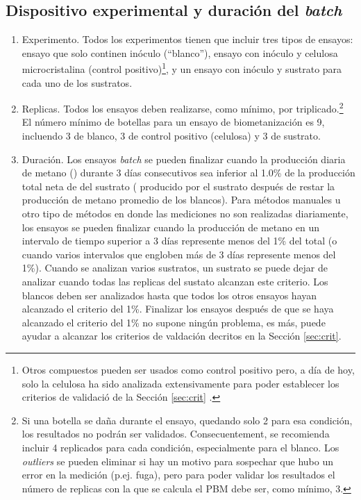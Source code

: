 \documentclass[]{article}
\begin{document}
\subsection{Dispositivo experimental y duración del \emph{batch}}
\label{sec:setup}
\begin{enumerate}
  \item Experimento. 
    Todos los experimentos tienen que incluir tres tipos de ensayos: ensayo que solo continen inóculo (``blanco''), ensayo con inóculo y celulosa microcristalina (control positivo)\footnote{
      Otros compuestos pueden ser usados como control positivo pero, a día de hoy, solo la celulosa ha sido analizada extensivamente para poder establecer los criterios de validació de la Sección \ref{sec:crit} \citep{hafnerImprovingInterlaboratoryReproducibility2020}.
    }, y un ensayo con inóculo y sustrato para cada uno de los sustratos.
    \item Replicas. 
    Todos los ensayos deben realizarse, como mínimo, por triplicado.\footnote{
      Si una botella se daña durante el ensayo, quedando solo 2 para esa condición, los resultados no podrán ser validados. Consecuentement, se recomienda incluir 4 replicados para cada condición, especialmente para el blanco. Los \emph{outliers} se pueden eliminar si hay un motivo para sospechar que hubo un error en la medición (p.ej. fuga), pero para poder validar los resultados el número de replicas con la que se calcula el PBM debe ser, como mínimo, 3.
    }
    El número mínimo de botellas para un ensayo de biometanización es 9, incluendo 3 de blanco, 3 de control positivo (celulosa) y 3 de sustrato.
  \item Duración. 
    Los ensayos \emph{batch} se pueden finalizar cuando la producción diaria de metano () durante 3 días consecutivos sea inferior al 1.0\% de la producción total neta de  del sustrato ( producido por el sustrato después de restar la producción de metano promedio de los blancos). 
    Para métodos manuales u otro tipo de métodos en donde las mediciones no son realizadas diariamente, los ensayos se pueden finalizar cuando la producción de metano en un intervalo de tiempo superior a 3 días represente menos del  1\% del total (o cuando varios intervalos que engloben más de 3 días represente menos del 1\%).
    Cuando se analizan varios sustratos, un sustrato se puede dejar de analizar cuando todas las replicas del sustato alcanzan este criterio.
    Los blancos deben ser analizados hasta que todos los otros ensayos hayan alcanzado el criterio del 1\%.
    Finalizar los ensayos después de que se haya alcanzado el criterio del 1\% no supone ningún problema, es más, puede ayudar a alcanzar los criterios de valdación decritos en la Sección \ref{sec:crit}.
\end{enumerate}
\end{document}
